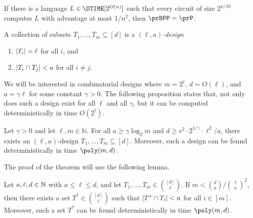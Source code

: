 \begin{corollary}
  If there is a language $L \in \DTIME[2^{O(n)}]$ such that
  every circuit of size $2^{n/10}$ computes $L$ with advantage at most $1/n^2$, then $\prBPP = \prP$.
\end{corollary}

\begin{definition}\label{def:design}
  A collection of subsets $T_1, \dots, T_m \subseteq [d]$ is a \emph{$(\ell, a)$-design}
	\begin{enumerate}
    \item $\lvert T_i\rvert = \ell$ for all $i$, and
		\item $\lvert T_i \cap T_j\rvert < a$ for all $i \ne j$.
	\end{enumerate}
\end{definition}

We will be interested in combinatorial designs where $m = 2^\ell$, $d =
O(\ell)$, and $a = \gamma \ell$ for some constant $\gamma > 0$. The following
proposition states that, not only does such a design exist for all $\ell$ and
all $\gamma$, but it can be computed deterministically in time $O(2^\ell)$.

\begin{theorem}\label{thm:design}
  Let $\gamma > 0 $ and let $\ell, m \in \mathbb{N}$. For all $a \ge \gamma
  \log_2{m}$ and $d \ge e^2 \cdot 2^{1/\gamma} \cdot \ell^2/a$, there exists an
  $(\ell, a)$-design $T_1, \dots, T_m \subseteq [d]$. Moreover, such a design
  can be found deterministically in time $\poly(m, d)$.
\end{theorem}

The proof of the theorem will use the following lemma.
\begin{lemma}\label{lem:design}
  Let $a, \ell, d \in \mathbb{N}$ with $a \le \ell \le d$, and let $T_1, \dots, T_m \in
  \binom{[d]}{\ell}$. If $m < \binom{d}{a} / \binom{\ell}{a}^2$, then there
  exists a set $T^* \in \binom{[d]}{\ell}$ such that $\lvert T^* \cap T_i\rvert < a$
  for all $i \in [m]$. Moreover, such a set $T^*$ can be found
  deterministically in time $\poly(m, d)$.
\end{lemma}


